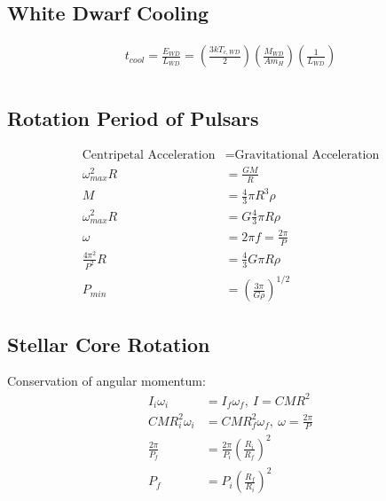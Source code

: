 \documentclass[a4paper,11pt,normalem]{article}
\begin{document}
\subsection{White Dwarf Cooling}

\begin{align*}
    t_{cool} = \frac{E_{WD}}{L_{WD}} = \left(\frac{3kT_{c,WD}}{2}\right) \left(\frac{M_{WD}}{Am_H}\right) \left(\frac{1}{L_{WD}}\right)
\end{align*}

\section{}

\subsection{Rotation Period of Pulsars}

\begin{align*}
    \text{Centripetal Acceleration} &= \text{Gravitational Acceleration} \\
    \omega^2_{max}R &= \frac{GM}{R} \\
    M &= \frac{4}{3}\pi R^3\rho \\
    \omega_{max}^2 R &= G \frac{4}{3}\pi R \rho \\
    \omega &= 2\pi f = \frac{2\pi}{P} \\
    \frac{4\pi^2}{P^2}R &= \frac{4}{3}G\pi R\rho \\
    P_{min} &= \left(\frac{3\pi}{G\rho}\right)^{1/2}
\end{align*}

\subsection{Stellar Core Rotation}

Conservation of angular momentum:
\begin{align*}
    I_i\omega_i &= I_f\omega_f, ~ I = CMR^2 \\
    CMR_i^2\omega_i &= CMR_f^2\omega_f, ~ \omega = \frac{2\pi}{P} \\
    \frac{2\pi}{P_f} &= \frac{2\pi}{P_i}\left(\frac{R_i}{R_f}\right)^2 \\
    P_f &= P_i\left(\frac{R_f}{R_i}\right)^2
\end{align*}
\end{document}

